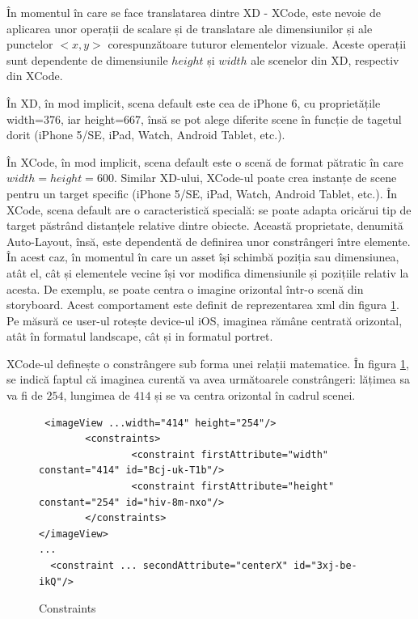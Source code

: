 În momentul în care se face translatarea dintre XD - XCode, este nevoie de aplicarea unor operații de scalare și de translatare ale dimensiunilor și ale punctelor $<x, y>$ corespunzătoare tuturor elementelor vizuale. Aceste operații sunt dependente de dimensiunile $height$ și $width$ ale scenelor din XD, respectiv din XCode. 

În XD, în mod implicit, scena default este cea de iPhone 6, cu proprietățile width=376, iar height=667, însă se pot alege diferite scene în funcție de tagetul dorit (iPhone 5/SE, iPad, Watch, Android Tablet, etc.). 

În XCode, în mod implicit, scena default este o scenă de format pătratic în care $width=height=600$. Similar XD-ului, XCode-ul poate crea instanțe de scene pentru un target specific (iPhone 5/SE, iPad, Watch, Android Tablet, etc.). În XCode, scena default are o caracteristică specială: se poate adapta oricărui tip de target păstrând distanțele relative dintre obiecte. Această proprietate, denumită Auto-Layout, însă, este dependentă de definirea unor constrângeri între elemente. În acest caz, în momentul în care un asset își schimbă poziția sau dimensiunea, atât el, cât și elementele vecine își vor modifica dimensiunile și pozițiile relativ la acesta. De exemplu, se poate centra o imagine orizontal într-o scenă din storyboard. Acest comportament este definit de reprezentarea xml din figura \ref{fig:Constraints}. Pe măsură ce user-ul rotește device-ul iOS, imaginea rămâne centrată orizontal, atât în formatul landscape, cât și in formatul portret.

XCode-ul definește o constrângere sub forma unei relații matematice. În figura \ref{fig:Constraints}, se indică faptul că imaginea curentă va avea următoarele constrângeri: lățimea sa va fi de $254$, lungimea de $414$ și se va centra orizontal în cadrul scenei.  

\begin{figure}[!htbp]
\lstset{language=XML}
\begin{lstlisting}
 <imageView ...width="414" height="254"/>
        <constraints>
                <constraint firstAttribute="width" constant="414" id="Bcj-uk-T1b"/>
                <constraint firstAttribute="height" constant="254" id="hiv-8m-nxo"/>
        </constraints>
</imageView>
...
  <constraint ... secondAttribute="centerX" id="3xj-be-ikQ"/>
\end{lstlisting}
\caption{Constraints} \label{fig:Constraints}
\end{figure}

